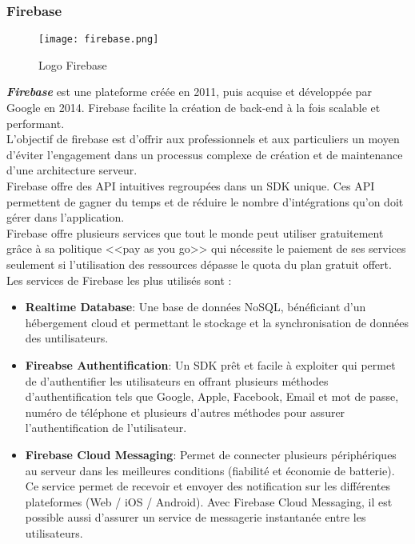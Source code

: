 \subsubsection{Firebase}
\vspace{1cm}
\begin{figure}[H]
    \centering
    \texttt{[image: firebase.png]}
    \vspace{1cm}
    \caption{Logo Firebase}
    \label{fig:firebase_logo}
\end{figure}
\textit{\textbf{Firebase}} est une plateforme créée en 2011, puis acquise et développée par Google en 2014. Firebase facilite la création de back-end à la fois scalable et performant.\\
\noindent L'objectif de firebase est d'offrir aux professionnels et aux particuliers un moyen d'éviter l'engagement dans un processus complexe de création et de maintenance d'une architecture serveur.\\
\noindent Firebase offre des API intuitives regroupées dans un SDK unique. Ces API permettent de gagner du temps et de réduire le nombre d'intégrations qu'on doit gérer dans l'application.\\
\noindent Firebase offre plusieurs services que tout le monde peut utiliser gratuitement grâce à sa politique <<pay as you go>> qui nécessite le paiement de ses services seulement si l'utilisation des ressources dépasse le quota du plan gratuit offert. Les services de Firebase les plus utilisés sont :
\begin{itemize}
    \item \textbf{Realtime Database}: Une base de données NoSQL, bénéficiant d'un hébergement cloud et permettant le stockage et la synchronisation de données des untilisateurs.
    \item \textbf{Fireabse Authentification}: Un SDK prêt et facile à exploiter qui permet de d'authentifier les utilisateurs en offrant plusieurs méthodes d'authentification tels que Google, Apple, Facebook, Email et mot de passe, numéro de téléphone et plusieurs d'autres méthodes pour assurer l'authentification de l'utilisateur.
    \item \textbf{Firebase Cloud Messaging}: Permet de connecter plusieurs périphériques au serveur dans les meilleures conditions (fiabilité et économie de batterie). Ce service permet de recevoir et envoyer des notification sur les différentes plateformes (Web / iOS / Android). Avec Firebase Cloud Messaging, il est possible aussi d'assurer un service de messagerie instantanée entre les utilisateurs.
\end{itemize}
